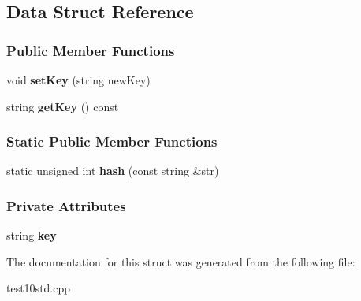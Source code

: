 \hypertarget{struct_data}{}\subsection{Data Struct Reference}
\label{struct_data}
\subsubsection*{Public Member Functions}
\begin{DoxyCompactItemize}
\item 
void {\bfseries set\+Key} (string new\+Key)\hypertarget{struct_data_a59bc7ecf5b7d3d4f358f87c87f62bcc3}{}\label{struct_data_a59bc7ecf5b7d3d4f358f87c87f62bcc3}

\item 
string {\bfseries get\+Key} () const \hypertarget{struct_data_aeca168b691885c7eb893f01ed54dabd9}{}\label{struct_data_aeca168b691885c7eb893f01ed54dabd9}

\end{DoxyCompactItemize}
\subsubsection*{Static Public Member Functions}
\begin{DoxyCompactItemize}
\item 
static unsigned int {\bfseries hash} (const string \&str)\hypertarget{struct_data_af98f6d2d78472b7c6f5ab7d7c9357d99}{}\label{struct_data_af98f6d2d78472b7c6f5ab7d7c9357d99}

\end{DoxyCompactItemize}
\subsubsection*{Private Attributes}
\begin{DoxyCompactItemize}
\item 
string {\bfseries key}\hypertarget{struct_data_adabe322de5988733fce4b0b9c853d5f2}{}\label{struct_data_adabe322de5988733fce4b0b9c853d5f2}

\end{DoxyCompactItemize}


The documentation for this struct was generated from the following file\+:\begin{DoxyCompactItemize}
\item 
test10std.\+cpp\end{DoxyCompactItemize}
